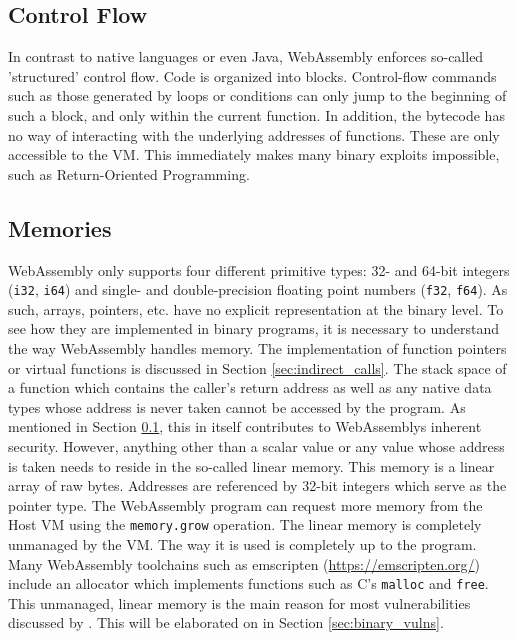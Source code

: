 \documentclass[sigconf]{acmart}
\begin{document}
\subsection{Control Flow}
\label{sec:wasm_control_flow}
In contrast to native languages or even Java, WebAssembly enforces so-called 'structured' control flow. Code is organized into blocks. Control-flow commands such as those generated by loops or conditions can only jump to the beginning of such a block, and only within the current function. In addition, the bytecode has no way of interacting with the underlying addresses of functions. These are only accessible to the VM. This immediately makes many binary exploits impossible, such as Return-Oriented Programming. 

\subsection{Memories} 
\label{sec:memories}
WebAssembly only supports four different primitive types: 32- and 64-bit integers (\texttt{i32}, \texttt{i64}) and single- and double-precision floating point numbers (\texttt{f32}, \texttt{f64}). As such, arrays, pointers, etc. have no explicit representation at the binary level. To see how they are implemented in binary programs, it is necessary to understand the way WebAssembly handles memory. The implementation of function pointers or virtual functions is discussed in Section \ref{sec:indirect_calls}. The stack space of a function which contains the caller's return address as well as any native data types whose address is never taken cannot be accessed by the program. As mentioned in Section \ref{sec:wasm_control_flow}, this in itself contributes to WebAssemblys inherent security. However, anything other than a scalar value or any value whose address is taken needs to reside in the so-called linear memory. This memory is a linear array of raw bytes. Addresses are referenced by 32-bit integers which serve as the pointer type. The WebAssembly program can request more memory from the Host VM using the \texttt{memory.grow} operation. The linear memory is completely unmanaged by the VM. The way it is used is completely up to the program. Many WebAssembly toolchains such as emscripten (\url{https://emscripten.org/}) include an allocator which implements functions such as C's \texttt{malloc} and \texttt{free}. This unmanaged, linear memory is the main reason for most vulnerabilities discussed by \citet{lehmann_everything_2020}. This will be elaborated on in Section \ref{sec:binary_vulns}.
\end{document}
